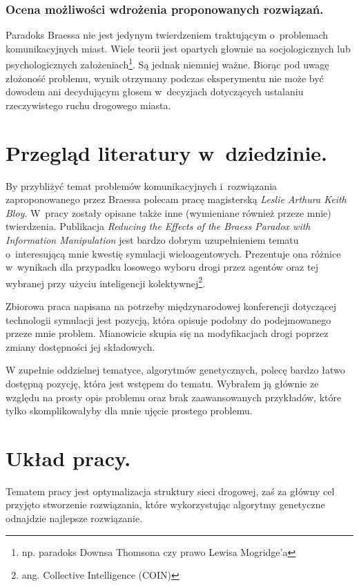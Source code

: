 \documentclass[twoside,12pt]{report}
\begin{document}
\subsubsection{Ocena możliwości wdrożenia proponowanych rozwiązań.}
Paradoks Braessa nie jest jedynym twierdzeniem traktującym o~problemach komunikacyjnych miast. Wiele teorii jest opartych głownie na socjologicznych lub psychologicznych założeniach\footnote{np. paradoks Downsa Thomsona\cite{downs} czy prawo Lewisa Mogridge’a\cite{lewis}}. Są jednak niemniej ważne.
Biorąc pod uwagę złożoność problemu, wynik otrzymany podczas eksperymentu nie może być dowodem ani decydującym głosem w~decyzjach dotyczących ustalaniu rzeczywistego ruchu drogowego miasta. 


\section{Przegląd literatury w~dziedzinie.}
By przybliżyć temat problemów komunikacyjnych i~rozwiązania zaproponowanego przez Braessa polecam pracę magisterską \textit{Leslie Arthura Keith Bloy}\cite{investigation}. W~pracy zostały opisane także inne (wymieniane również przeze mnie) twierdzenia. Publikacja \textit{Reducing the Effects of the Braess Paradox with Information Manipulation}\cite{reducingtheeffects} jest bardzo dobrym uzupełnieniem tematu o~interesującą mnie kwestię symulacji wieloagentowych. Prezentuje ona różnice w~wynikach dla przypadku losowego wyboru drogi przez agentów oraz tej wybranej przy użyciu inteligencji kolektywnej\footnote{ang. Collective Intelligence (COIN)}. 

Zbiorowa praca napisana na potrzeby międzynarodowej konferencji dotyczącej technologii symulacji\cite{reducingtheeffects} jest pozycją, która opisuje podobny do podejmowanego przeze mnie problem. Mianowicie skupia się na modyfikacjach drogi poprzez zmiany dostępności jej składowych.

W zupełnie oddzielnej tematyce, algorytmów genetycznych, polecę bardzo łatwo dostępną pozycję, która jest wstępem do tematu\cite{gene}. Wybrałem ją głównie ze względu na prosty opis problemu oraz brak zaawansowanych przykładów, które tylko skomplikowałyby dla mnie ujęcie prostego problemu.

\section{Układ pracy.}
Tematem pracy jest optymalizacja struktury sieci drogowej, zaś za główny cel przyjęto stworzenie rozwiązania, które wykorzystując algorytmy genetyczne odnajdzie najlepsze rozwiązanie.
 
\end{document}
